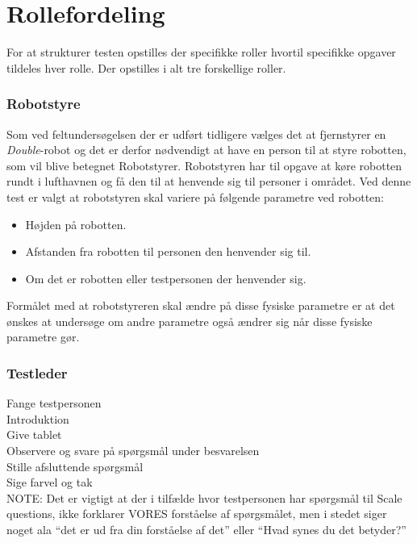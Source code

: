 \section{Rollefordeling}
\label{TestAfSkalaRollefordeling}
%
For at strukturer testen opstilles der specifikke roller hvortil specifikke opgaver tildeles hver rolle. Der opstilles i alt tre forskellige roller. 
%
\subsubsection*{Robotstyre}
Som ved feltundersøgelsen der er udført tidligere vælges det at fjernstyrer en \textit{Double}-robot og det er derfor nødvendigt at have en person til at styre robotten, som vil blive betegnet Robotstyrer. \blankline
%
Robotstyren har til opgave at køre robotten rundt i lufthavnen og få den til at henvende sig til personer i området. Ved denne test er valgt at robotstyren skal variere på følgende parametre ved robotten: 
\begin{itemize}
	\item Højden på robotten. 
	\item Afstanden fra robotten til personen den henvender sig til. 
	\item Om det er robotten eller testpersonen der henvender sig. 
\end{itemize}
Formålet med at robotstyreren skal ændre på disse fysiske parametre er at det ønskes at undersøge om andre parametre også ændrer sig når disse fysiske parametre gør. 

\subsubsection*{Testleder}
Fange testpersonen \\
Introduktion \\
Give tablet \\
Observere og svare på spørgsmål under besvarelsen \\
Stille afsluttende spørgsmål \\
Sige farvel og tak \\

NOTE: Det er vigtigt at der i tilfælde hvor testpersonen har spørgsmål til Scale questions, ikke forklarer VORES forståelse af spørgsmålet, men i stedet siger noget ala “det er ud fra din forståelse af det” eller “Hvad synes du det betyder?” 

